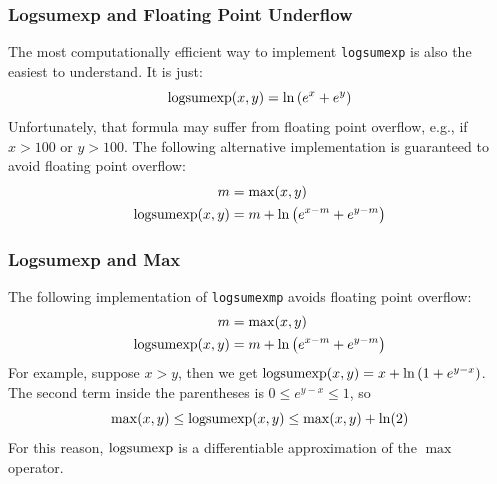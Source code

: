 \documentclass{beamer}
\newcommand{\logsumexp}{\operatornamewithlimits{logsumexp}}
\begin{document}
\begin{frame}
  \frametitle{Logsumexp and Floating Point Underflow}

  The most computationally efficient way to implement {\tt logsumexp}
  is also the easiest to understand.  It is just:
  \begin{displaymath}
    \logsumexp(x,y) = \ln \left(e^{x}+e^{y}\right)
  \end{displaymath}
  Unfortunately, that formula may suffer from floating point
  overflow, e.g., if $x>100$ or $y>100$.  The following
  alternative implementation is guaranteed to  avoid floating point overflow:
  \begin{align*}
    m &= \max(x,y)\\
    \logsumexp(x,y) &= m +\ln \left(e^{x-m}+e^{y-m}\right)
  \end{align*}
\end{frame}

\begin{frame}
  \frametitle{Logsumexp and Max}

  The following implementation of {\tt logsumexmp} avoids floating
  point overflow:
  \begin{align*}
    m &= \max(x,y)\\
    \logsumexp(x,y) &= m +\ln \left(e^{x-m}+e^{y-m}\right)
  \end{align*}
  For example, suppose $x>y$, then we get $\logsumexp(x,y) = x +\ln
  \left(1+e^{y-x}\right)$.  The second term inside the parentheses is
  $0\le e^{y-x}\le 1$, so
  \begin{displaymath}
    \max(x,y) \le \logsumexp(x,y) \le \max(x,y)+\ln(2)
  \end{displaymath}
  For this reason, $\logsumexp$ is a differentiable approximation of
  the $\max$ operator.
\end{frame}
\end{document}
